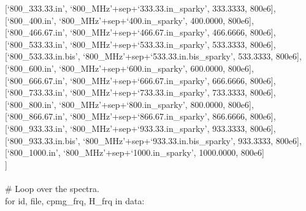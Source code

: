 \begin{exampleenv}
\hspace*{4ex} [`800\_333.33.in',       `800\_MHz'+sep+`333.33.in\_sparky',          333.3333,  800e6], \\
\hspace*{4ex} [`800\_400.in',          `800\_MHz'+sep+`400.in\_sparky',             400.0000,  800e6], \\
\hspace*{4ex} [`800\_466.67.in',       `800\_MHz'+sep+`466.67.in\_sparky',          466.6666,  800e6], \\
\hspace*{4ex} [`800\_533.33.in',       `800\_MHz'+sep+`533.33.in\_sparky',          533.3333,  800e6], \\
\hspace*{4ex} [`800\_533.33.in.bis',   `800\_MHz'+sep+`533.33.in.bis\_sparky',      533.3333,  800e6], \\
\hspace*{4ex} [`800\_600.in',          `800\_MHz'+sep+`600.in\_sparky',             600.0000,  800e6], \\
\hspace*{4ex} [`800\_666.67.in',       `800\_MHz'+sep+`666.67.in\_sparky',          666.6666,  800e6], \\
\hspace*{4ex} [`800\_733.33.in',       `800\_MHz'+sep+`733.33.in\_sparky',          733.3333,  800e6], \\
\hspace*{4ex} [`800\_800.in',          `800\_MHz'+sep+`800.in\_sparky',             800.0000,  800e6], \\
\hspace*{4ex} [`800\_866.67.in',       `800\_MHz'+sep+`866.67.in\_sparky',          866.6666,  800e6], \\
\hspace*{4ex} [`800\_933.33.in',       `800\_MHz'+sep+`933.33.in\_sparky',          933.3333,  800e6], \\
\hspace*{4ex} [`800\_933.33.in.bis',   `800\_MHz'+sep+`933.33.in.bis\_sparky',      933.3333,  800e6], \\
\hspace*{4ex} [`800\_1000.in',         `800\_MHz'+sep+`1000.in\_sparky',           1000.0000,  800e6] \\
] \\
 \\
\# Loop over the spectra. \\
for id, file, cpmg\_frq, H\_frq in data: \\

\end{exampleenv}
